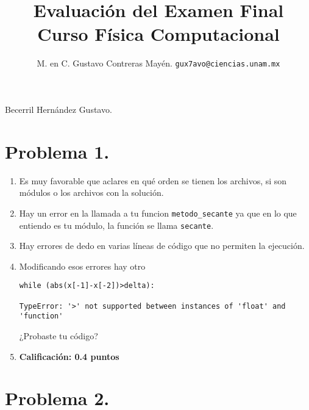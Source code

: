 
\usepackage{minted}

\author{M. en C. Gustavo Contreras Mayén. \texttt{gux7avo@ciencias.unam.mx}}
\title{Evaluación del Examen Final \\ {\large Curso Física Computacional}}
\date{ }


\maketitle
\fontsize{14}{14}\selectfont

\Large{Becerril Hernández Gustavo.}

\section{Problema 1.}

\begin{enumerate}
\item Es muy favorable que aclares en qué orden se tienen los archivos, si son módulos o los archivos con la solución.
\item Hay un error en la llamada a tu funcion \texttt{metodo\_secante} ya que en lo que entiendo es tu módulo, la función se llama \texttt{secante}.
\item Hay errores de dedo en varias líneas de código que no permiten la ejecución.
\item Modificando esos errores hay otro
\begin{verbatim}
while (abs(x[-1]-x[-2])>delta):

TypeError: '>' not supported between instances of 'float' and 'function'
\end{verbatim}
¿Probaste tu código?
\item \textbf{Calificación: 0.4 puntos}
\end{enumerate}

\section{Problema 2.}

